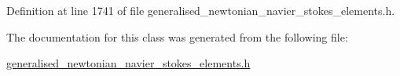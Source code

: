 Definition at line 1741 of file generalised\+\_\+newtonian\+\_\+navier\+\_\+stokes\+\_\+elements.\+h.



The documentation for this class was generated from the following file\+:\begin{DoxyCompactItemize}
\item 
\hyperlink{generalised__newtonian__navier__stokes__elements_8h}{generalised\+\_\+newtonian\+\_\+navier\+\_\+stokes\+\_\+elements.\+h}\end{DoxyCompactItemize}

